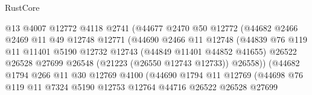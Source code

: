\begin{lexlean}{RustCore}
\begin{coremodule}
                                @13
                                @4007
                                @12772
                                @4118
                                @2741
                                (@44677
                                  @2470
                                  @50
                                  @12772
                                  (@44682
                                    @2466
                                    @2469
                                    @11
                                    @49
                                    @12748
                                    @12771
                                    (@44690
                                      @2466
                                      @11
                                      @12748
                                      (@44839
                                        @76
                                        @119
                                        @11
                                        @11401
                                        @5190
                                        @12732
                                        @12743
                                        (@44849 @11401 @44852 @41655)
                                        @26522
                                        @26528
                                        @27699
                                        @26548
                                        (@21223 (@26550 @12743 @12733))
                                        @26558))
                                    (@44682
                                      @1794
                                      @266
                                      @11
                                      @30
                                      @12769
                                      @4100
                                      (@44690
                                        @1794
                                        @11
                                        @12769
                                        (@44698
                                          @76
                                          @119
                                          @11
                                          @7324
                                          @5190
                                          @12753
                                          @12764
                                          @44716
                                          @26522
                                          @26528
                                          @27699

\end{coremodule}
\end{lexlean}
